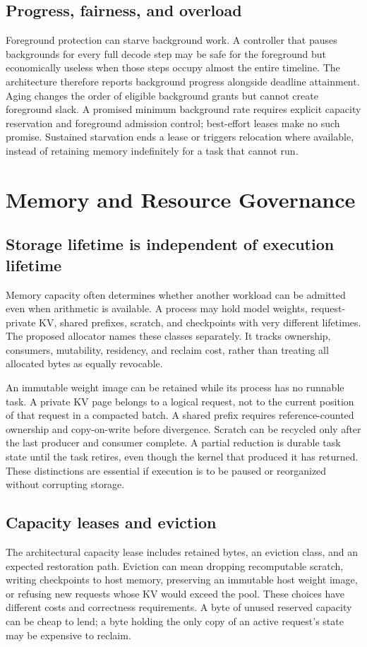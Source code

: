 \subsection{Progress, fairness, and overload}
Foreground protection can starve background work. A controller that pauses
backgrounds for every full decode step may be safe for the foreground but
economically useless when those steps occupy almost the entire timeline.
The architecture therefore reports background progress alongside deadline
attainment. Aging changes the order of eligible background grants but cannot
create foreground slack. A promised minimum background rate requires explicit
capacity reservation and foreground admission control; best-effort leases make
no such promise. Sustained starvation ends a lease or triggers relocation where
available, instead of retaining memory indefinitely for a task that cannot run.

\section{Memory and Resource Governance}
\label{sec:memory}
\subsection{Storage lifetime is independent of execution lifetime}
Memory capacity often determines whether another workload can be admitted
even when arithmetic is available. A process may hold model weights,
request-private KV, shared prefixes, scratch, and checkpoints with very
different lifetimes. The proposed allocator names these classes separately.
It tracks ownership, consumers, mutability, residency, and reclaim cost,
rather than treating all allocated bytes as equally revocable.

An immutable weight image can be retained while its process has no runnable
task. A private KV page belongs to a logical request, not to the current
position of that request in a compacted batch. A shared prefix requires
reference-counted ownership and copy-on-write before divergence. Scratch can
be recycled only after the last producer and consumer complete. A partial
reduction is durable task state until the task retires, even though the
kernel that produced it has returned. These distinctions are essential if
execution is to be paused or reorganized without corrupting storage.

\subsection{Capacity leases and eviction}
The architectural capacity lease includes retained bytes, an eviction class,
and an expected restoration path. Eviction can mean dropping recomputable
scratch, writing checkpoints to host memory, preserving an immutable host
weight image, or refusing new requests whose KV would exceed the pool.
These choices have different costs and correctness requirements. A byte of
unused reserved capacity can be cheap to lend; a byte holding the only copy
of an active request's state may be expensive to reclaim.

